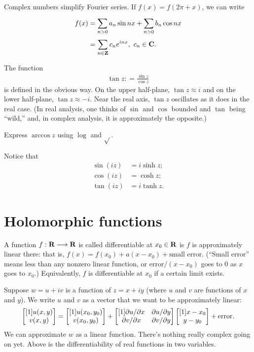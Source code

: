 \documentclass[11pt, oneside,margin=1in]{article}
\begin{document}
Complex numbers simplify Fourier series. If $f(x) =f(2\pi+x)$, we can write
\begin{align*}
	f(x) &=  \sum_{n>0}^{} a_n\sin nx + \sum_{n>0}^{} b_n\cos nx\\
	     &= \sum_{n\in\mathbf Z}^{} c_ne^{inx},\ c_n\in \mathbf C.
\end{align*}

The function
\begin{align*}
	\tan z: = \frac{\sin z}{\cos z}
\end{align*}
is defined in the obvious way. On the upper half-plane, $\tan z \approx i$ and on the lower half-plane, $\tan z \approx -i$. Near the real axis, $\tan z$ oscillates as it does in the real case. (In real analysis, one thinks of $\sin$ and $\cos$ bounded and $\tan$ being ``wild,'' and, in complex analysis, it is approximately the opposite.)

 \begin{exercise}\label{}\text{}
Express $\arccos z$ using $\log$ and $\sqrt{} $.
\end{exercise}

Notice that 
\begin{align*}
	\sin (iz) &= i\sinh z;\\
	\cos (iz) &= \cosh z;\\
	\tan (iz) &= i\tanh z.
\end{align*}

\section{Holomorphic functions}
A function $f:\mathbf R\longrightarrow \mathbf R$ is called differentiable at $x_0\in \mathbf R$ is $f$ is approximately linear there: that is, $f(x)= f (x_0)+a (x-x_0) + \textrm{small error}$. (``Small error'' means less than any nonzero linear function, or $\mathrm{error}/(x-x_0)$ goes to $0$ as $x$ goes to $x_0$.) Equivalently, $f$ is differentiable at $x_0$ if a certain limit exists. 

Suppose $w=u+iv$ is a function of $z=x+iy$ (where $u$ and $v$ are functions of $x$ and $y$). We write $u$ and $v$ as a vector that we want to be approximately linear:
 \begin{align*}
	 \begin{bmatrix} [1] u(x,y) \\ v (x,y)\end{bmatrix} = \begin{bmatrix} [1] u (x_0,y_0) \\ v (x_0,y_0)\end{bmatrix} + \begin{bmatrix} [1] \partial u/\partial x&\partial u/\partial y\\ \partial v/\partial x&\partial v / \partial y\end{bmatrix}\begin{bmatrix} [1] x-x_0\\y-y_0\end{bmatrix} + \mathrm{error}.
\end{align*}
We can approximate $w$ as a linear function. There's nothing really complex going on yet. Above is the differentiability of real functions in two variables. 
\end{document}
